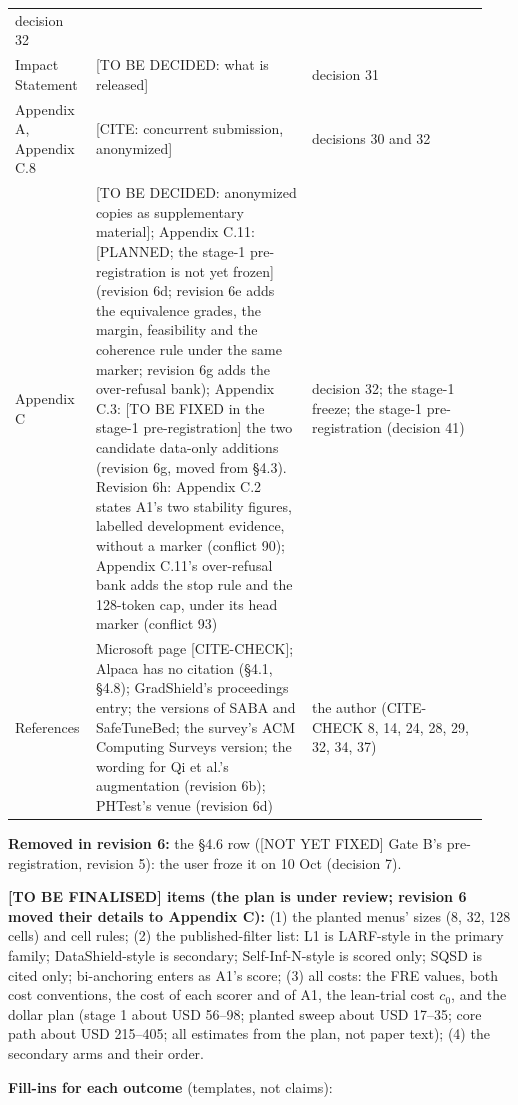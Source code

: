 \documentclass{article}
\theoremstyle{plain}
\theoremstyle{definition}
\theoremstyle{remark}
\begin{document}
\begin{longtable}{@{}L{0.14\linewidth}L{0.44\linewidth}L{0.36\linewidth}@{}}
      decision 32 \\
  Impact Statement & [TO BE DECIDED: what is released] & decision 31 \\
  Appendix A, Appendix C.8 & [CITE: concurrent submission, anonymized] &
      decisions 30 and 32 \\
  Appendix C & [TO BE DECIDED: anonymized copies as supplementary material];
      Appendix C.11: [PLANNED; the stage-1 pre-registration is not yet frozen]
      (revision 6d; revision 6e adds the equivalence grades, the margin,
      feasibility and the coherence rule under the same marker; revision 6g adds
      the over-refusal bank); Appendix C.3: [TO BE FIXED in the stage-1
      pre-registration] the two candidate data-only additions (revision 6g,
      moved from \S{}4.3). Revision 6h: Appendix C.2 states A1's two stability
      figures, labelled development evidence, without a marker (conflict 90);
      Appendix C.11's over-refusal bank adds the stop rule and the 128-token
      cap, under its head marker (conflict 93) & decision 32; the stage-1
      freeze; the stage-1 pre-registration (decision 41) \\
  References & Microsoft page [CITE-CHECK]; Alpaca has no citation (\S{}4.1,
      \S{}4.8); GradShield's proceedings entry; the versions of SABA and
      SafeTuneBed; the survey's ACM Computing Surveys version; the wording for
      Qi et al.'s augmentation (revision 6b); PHTest's venue (revision 6d) & the
      author (CITE-CHECK 8, 14, 24, 28, 29, 32, 34, 37) \\
\end{longtable}

\textbf{Removed in revision 6:} the \S{}4.6 row ([NOT YET FIXED] Gate B's
pre-registration, revision 5): the user froze it on 10 Oct (decision 7).

\textbf{[TO BE FINALISED] items (the plan is under review; revision 6 moved
their details to Appendix C):} (1) the planted menus' sizes (8, 32, 128 cells)
and cell rules; (2) the published-filter list: L1 is LARF-style in the primary
family; DataShield-style is secondary; Self-Inf-N-style is scored only; SQSD is
cited only; bi-anchoring enters as A1's score; (3) all costs: the FRE values,
both cost conventions, the cost of each scorer and of A1, the lean-trial cost
$c_0$, and the dollar plan (stage 1 about USD 56--98; planted sweep about USD
17--35; core path about USD 215--405; all estimates from the plan, not paper
text); (4) the secondary arms and their order.

\textbf{Fill-ins for each outcome} (templates, not claims):
\end{document}
